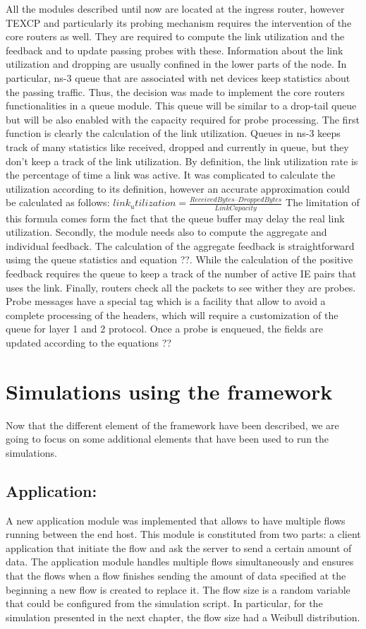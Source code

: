 All the modules described until now are located at the ingress router, however TEXCP and particularly its probing mechanism requires the intervention of the core routers as well. They are required to compute the link utilization and the feedback and to update passing probes with these. Information about the link utilization and dropping are usually confined in the lower parts of the node. In particular, ns-3 queue that are associated with net devices keep statistics about the passing traffic. Thus, the decision was made to implement the core routers functionalities in a queue module. This queue will be similar to a drop-tail queue but will be also enabled with the capacity required for probe processing. The first function is clearly the calculation of the link utilization. Queues in ns-3 keeps track of many statistics like received, dropped and currently in queue, but they don't keep a track of the link utilization. By definition, the link utilization rate is the percentage of time a link was active. It was complicated to calculate the utilization according to its definition, however an accurate approximation could be calculated as follows:
$link_utilization = \frac{ReceivedBytes – DroppedBytes}{LinkCapacity}$
The limitation of this formula comes form the fact that the queue buffer may delay the real link utilization.
Secondly, the module needs also to compute the aggregate and individual feedback. The calculation of the aggregate feedback is straightforward usimg the queue statistics and equation ??. While the calculation of the positive feedback requires the queue to keep a track of the number of active IE pairs that uses the link.
Finally, routers check all the packets to see wither they are probes. Probe messages have a special tag which is a facility that allow to avoid a complete processing  of the headers, which will require a customization of the queue for layer 1 and 2 protocol. Once a probe is enqueued, the fields are updated according to the equations ??

\section{Simulations using the framework}
Now that the different element of the framework have been described, we are going to focus on some additional elements that have been used to run the simulations.

\subsection{Application: }
A new application module was implemented that allows to have multiple flows running between the end host. This module is constituted from two parts: a client application that initiate the flow and ask the server to send a certain amount of data. The application module handles multiple flows simultaneously and ensures that the flows when a flow finishes sending the amount of data specified at the beginning a new flow is created to replace it. The flow size is a random variable that could  be configured from the simulation script. In particular, for the simulation presented in the next chapter, the flow size had  a Weibull distribution.

